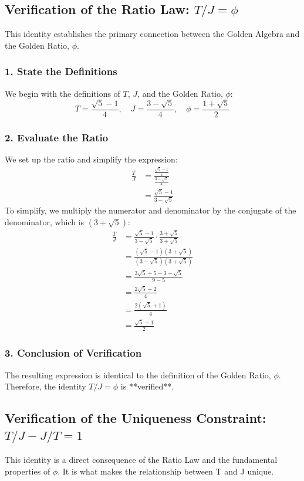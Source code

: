 \subsection{Verification of the Ratio Law: \texorpdfstring{\(T / J = \phi\)}{T / J = phi}}
This identity establishes the primary connection between the Golden Algebra and the Golden Ratio, $\phi$.

\subsubsection*{1. State the Definitions}
We begin with the definitions of $T$, $J$, and the Golden Ratio, $\phi$:
$$ T = \frac{\sqrt{5}-1}{4}, \quad J = \frac{3-\sqrt{5}}{4}, \quad \phi = \frac{1+\sqrt{5}}{2} $$

\subsubsection*{2. Evaluate the Ratio}
We set up the ratio and simplify the expression:
\begin{align*}
\frac{T}{J} &= \frac{\frac{\sqrt{5}-1}{4}}{\frac{3-\sqrt{5}}{4}} \\
&= \frac{\sqrt{5}-1}{3-\sqrt{5}}
\end{align*}
To simplify, we multiply the numerator and denominator by the conjugate of the denominator, which is $(3+\sqrt{5})$:
\begin{align*}
\frac{T}{J} &= \frac{\sqrt{5}-1}{3-\sqrt{5}} \cdot \frac{3+\sqrt{5}}{3+\sqrt{5}} \\
&= \frac{(\sqrt{5}-1)(3+\sqrt{5})}{(3-\sqrt{5})(3+\sqrt{5})} \\
&= \frac{3\sqrt{5}+5-3-\sqrt{5}}{9-5} \\
&= \frac{2\sqrt{5}+2}{4} \\
&= \frac{2(\sqrt{5}+1)}{4} \\
&= \frac{\sqrt{5}+1}{2}
\end{align*}

\subsubsection*{3. Conclusion of Verification}
The resulting expression is identical to the definition of the Golden Ratio, $\phi$. Therefore, the identity $T/J = \phi$ is **verified**.

\newpage
\subsection{Verification of the Uniqueness Constraint: \texorpdfstring{\(T/J - J/T = 1\)}{T/J - J/T = 1}}
This identity is a direct consequence of the Ratio Law and the fundamental properties of $\phi$. It is what makes the relationship between T and J unique.

